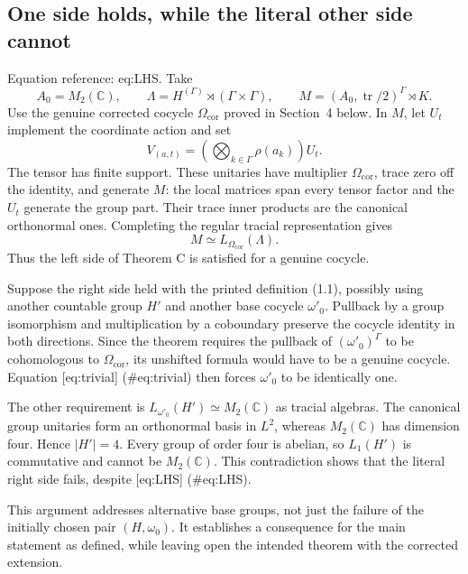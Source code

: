 \documentclass[10pt]{article}
\begin{document}
\subsection*{One side holds, while the literal other side cannot}
Equation reference: eq:LHS. Take \[A_0=M_2(\mathbb C),\qquad
 \Lambda=H^{(\Gamma)}\rtimes(\Gamma\times\Gamma),
 \qquad M=(A_0,\operatorname{tr}/2)^\Gamma\rtimes K.\] Use the genuine corrected cocycle \(\Omega_{\mathrm{cor}}\) proved in Section 4 below. In \(M\), let \(U_t\) implement the coordinate action and set \[V_{(a,t)}=\left(\bigotimes_{k\in\Gamma}\rho(a_k)\right)U_t.\] The tensor has finite support. These unitaries have multiplier \(\Omega_{\mathrm{cor}}\), trace zero off the identity, and generate \(M\): the local matrices span every tensor factor and the \(U_t\) generate the group part. Their trace inner products are the canonical orthonormal ones. Completing the regular tracial representation gives \[
 M\simeq L_{\Omega_{\mathrm{cor}}}(\Lambda).\] Thus the left side of Theorem C is satisfied for a genuine cocycle.\par
Suppose the right side held with the printed definition (1.1), possibly using another countable group \(H'\) and another base cocycle \(\omega'_0\). Pullback by a group isomorphism and multiplication by a coboundary preserve the cocycle identity in both directions. Since the theorem requires the pullback of \((\omega'_0)^\Gamma\) to be cohomologous to \(\Omega_{\mathrm{cor}}\), its unshifted formula would have to be a genuine cocycle. Equation [eq:trivial] (\#eq:trivial) then forces \(\omega'_0\) to be identically one.\par
The other requirement is \(L_{\omega'_0}(H')\simeq M_2(\mathbb C)\) as tracial algebras. The canonical group unitaries form an orthonormal basis in \(L^2\), whereas \(M_2(\mathbb C)\) has dimension four. Hence \(|H'|=4\). Every group of order four is abelian, so \(L_1(H')\) is commutative and cannot be \(M_2(\mathbb C)\). This contradiction shows that the literal right side fails, despite [eq:LHS] (\#eq:LHS).\par
This argument addresses alternative base groups, not just the failure of the initially chosen pair \((H,\omega_0)\). It establishes a consequence for the main statement as defined, while leaving open the intended theorem with the corrected extension.\par
\end{document}
